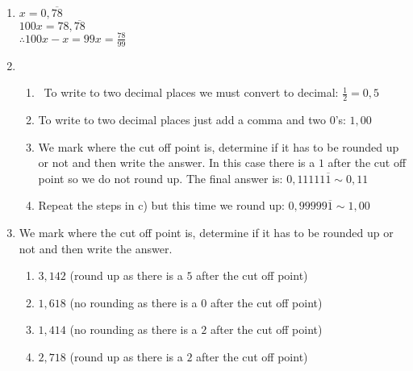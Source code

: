 \begin{eocsolutions}{}
{\begin{enumerate}[itemsep=6pt, label=\textbf{\arabic*}. ]

\item %
$x=0,\overline{78}$\\
$100x=78,\overline{78}$\\ 
$\therefore 100x-x=99x=\frac{78}{99}$
\item %
    \begin{enumerate}[noitemsep, label=\textbf{(\alph*)} ]  
    \item  To write to two decimal places we must convert to decimal: $\frac{1}{2}=0,5$%
    \item To write to two decimal places just add a comma and two $0$'s: $1,00$%
    \item We mark where the cut off point is, determine if it has to be rounded up or not and then write the answer. In this case there is a $1$ 
after the cut off point so we do not round up. The final answer is: $0,11111\overline{1} \sim 0,11$%
    \item Repeat the steps in c) but this time we round up: $0,99999\overline{1} \sim 1,00$%
    \end{enumerate}

\item %
We mark where the cut off point is, determine if it has to be rounded up or not and then write the answer. 
    \begin{enumerate}[noitemsep, label=\textbf{(\alph*)} ] 
\item $3,142$ (round up as there is a $5$ after the cut off point) 
\item $1,618$ (no rounding as there is a $0$ after the cut off point) 
\item $1,414$ (no rounding as there is a $2$ after the cut off point) 
\item $2,718$ (round up as there is a $2$ after the cut off point) 
    \end{enumerate}


\end{enumerate}}
\end{eocsolutions}
